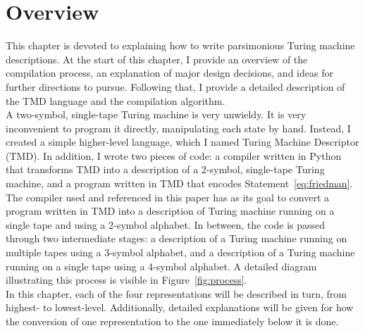 \documentclass{report}
\begin{document}
\section{Overview}

This chapter is devoted to explaining how to write parsimonious Turing machine descriptions. At the start of this chapter, I provide an overview of the compilation process, an explanation of major design decisions, and ideas for further directions to pursue. Following that, I provide a detailed description of the TMD language and the compilation algorithm. \\

A two-symbol, single-tape Turing machine is very unwieldy. It is very inconvenient to program it directly, manipulating each state by hand. Instead, I created a simple higher-level language, which I named Turing Machine Descriptor (TMD). In addition, I wrote two pieces of code: a compiler written in Python that transforms TMD into a description of a 2-symbol, single-tape Turing machine, and a program written in TMD that encodes Statement~\ref{eq:friedman}. \\
 
The compiler used and referenced in this paper has as its goal to convert a program written in TMD into a description of Turing machine running on a single tape and using a 2-symbol alphabet. In between, the code is passed through two intermediate stages: a description of a Turing machine running on multiple tapes using a 3-symbol alphabet, and a description of a Turing machine running on a single tape using a 4-symbol alphabet. A detailed diagram illustrating this process is visible in Figure~\ref{fig:process}. \\

In this chapter, each of the four representations will be described in turn, from highest- to lowest-level. Additionally, detailed explanations will be given for how the conversion of one representation to the one immediately below it is done.
\end{document}
